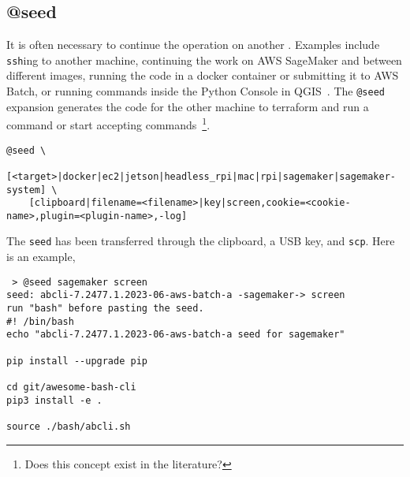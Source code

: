 \subsection{@seed}
\label{seed}

It is often necessary to continue the operation on another . Examples include \texttt{ssh}ing to another machine, continuing the work on AWS SageMaker and between different images, running the code in a docker container or submitting it to AWS Batch, or running commands inside the Python Console in QGIS~. The \texttt{@seed} expansion generates the code for the other machine to terraform and run a command or start accepting commands~\footnote{Does this concept exist in the literature?}.
%
\begin{verbatim}
@seed \
    [<target>|docker|ec2|jetson|headless_rpi|mac|rpi|sagemaker|sagemaker-system] \
    [clipboard|filename=<filename>|key|screen,cookie=<cookie-name>,plugin=<plugin-name>,-log]
\end{verbatim}
%
The \texttt{seed} has been transferred through the clipboard, a USB key, and \texttt{scp}. Here is an example,
%
\begin{verbatim}
 > @seed sagemaker screen
seed: abcli-7.2477.1.2023-06-aws-batch-a -sagemaker-> screen
run "bash" before pasting the seed.
#! /bin/bash
echo "abcli-7.2477.1.2023-06-aws-batch-a seed for sagemaker"

pip install --upgrade pip

cd git/awesome-bash-cli
pip3 install -e .

source ./bash/abcli.sh
\end{verbatim}